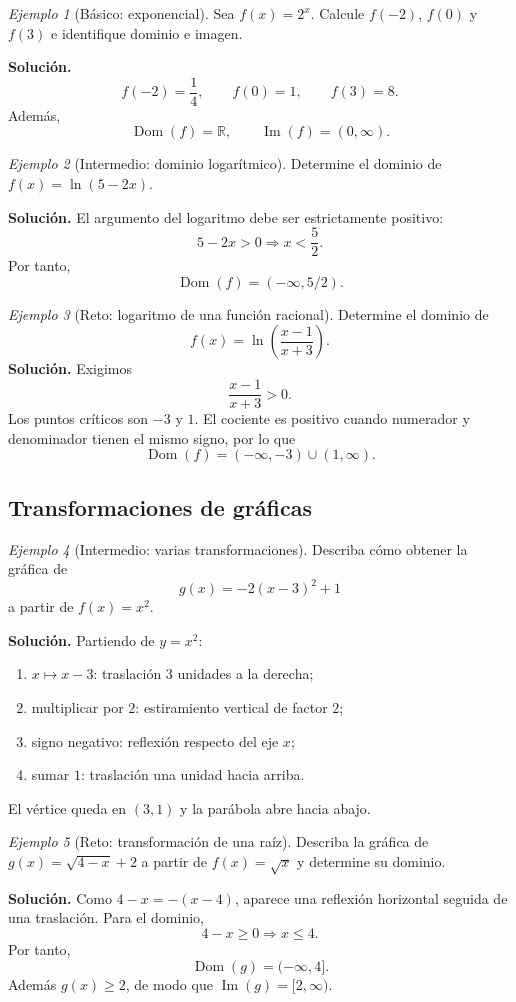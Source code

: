 \documentclass[12pt]{article}
\theoremstyle{remark}
\newtheorem{ejemplo}{Ejemplo}[section]
\newcommand{\R}{\mathbb{R}}
\newcommand{\Dom}{\operatorname{Dom}}
\newcommand{\Ima}{\operatorname{Im}}
\begin{document}
\begin{ejemplo}[Básico: exponencial]
Sea $f(x)=2^x$. Calcule $f(-2)$, $f(0)$ y $f(3)$ e identifique dominio e imagen.

\textbf{Solución.}
\[
f(-2)=\frac14,\qquad f(0)=1,\qquad f(3)=8.
\]
Además,
\[
\boxed{\Dom(f)=\R,\qquad \Ima(f)=(0,\infty)}.
\]
\end{ejemplo}

\begin{ejemplo}[Intermedio: dominio logarítmico]
Determine el dominio de $f(x)=\ln(5-2x)$.

\textbf{Solución.} El argumento del logaritmo debe ser estrictamente positivo:
\[
5-2x>0\Longrightarrow x<\frac52.
\]
Por tanto,
\[
\boxed{\Dom(f)=(-\infty,5/2)}.
\]
\end{ejemplo}

\begin{ejemplo}[Reto: logaritmo de una función racional]
Determine el dominio de
\[
f(x)=\ln\left(\frac{x-1}{x+3}\right).
\]
\textbf{Solución.} Exigimos
\[
\frac{x-1}{x+3}>0.
\]
Los puntos críticos son $-3$ y $1$. El cociente es positivo cuando numerador y denominador tienen el mismo signo, por lo que
\[
\boxed{\Dom(f)=(-\infty,-3)\cup(1,\infty)}.
\]
\end{ejemplo}

\subsection{Transformaciones de gráficas}

\begin{ejemplo}[Intermedio: varias transformaciones]
Describa cómo obtener la gráfica de
\[
g(x)=-2(x-3)^2+1
\]
a partir de $f(x)=x^2$.

\textbf{Solución.} Partiendo de $y=x^2$:
\begin{enumerate}
\item $x\mapsto x-3$: traslación $3$ unidades a la derecha;
\item multiplicar por $2$: estiramiento vertical de factor $2$;
\item signo negativo: reflexión respecto del eje $x$;
\item sumar $1$: traslación una unidad hacia arriba.
\end{enumerate}
El vértice queda en $(3,1)$ y la parábola abre hacia abajo.
\end{ejemplo}

\begin{ejemplo}[Reto: transformación de una raíz]
Describa la gráfica de $g(x)=\sqrt{4-x}+2$ a partir de $f(x)=\sqrt{x}$ y determine su dominio.

\textbf{Solución.} Como $4-x=-(x-4)$, aparece una reflexión horizontal seguida de una traslación. Para el dominio,
\[
4-x\ge0\Longrightarrow x\le4.
\]
Por tanto,
\[
\boxed{\Dom(g)=(-\infty,4]}.
\]
Además $g(x)\ge2$, de modo que $\Ima(g)=[2,\infty)$.
\end{ejemplo}
\end{document}
